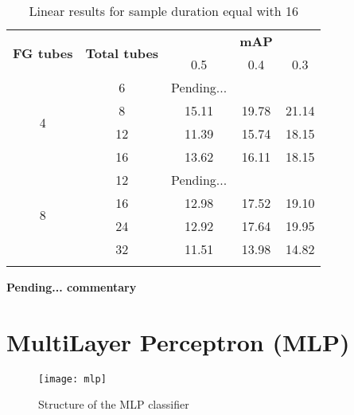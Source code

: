 \begin{center}
  \begin{longtable}{|| c | c || c c c ||}
    \hline
    \multirow{2}{*}{\textbf{FG tubes}} & \multirow{2}{*}{\textbf{Total tubes}} & {} & \textbf{mAP} & {} \\
    {} & {} & 0.5 & 0.4 & 0.3 \\
    \hline
    \multirow{4}{*}{4} & 6 & Pending...\\
    \cline{2-5}
    {} & 8 & 15.11 & 19.78 & 21.14 \\
    \cline{2-5}
    {} & 12 & 11.39 & 15.74 & 18.15 \\
    \cline{2-5}
    {} & 16 & 13.62 & 16.11 & 18.15 \\
    \hline
    \multirow{4}{*}{8} & 12 & Pending...\\
    \cline{2-5}
    {} & 16 & 12.98 & 17.52 & 19.10 \\
    \cline{2-5}
    {} & 24 & 12.92 & 17.64 & 19.95 \\
    \cline{2-5}
    {} & 32 & 11.51 & 13.98 & 14.82 \\
    \hline

  \caption{Linear results for sample duration equal with 16}
  \label{table:linear_16}
\end{longtable}
\end{center}

\textbf{ Pending... commentary}

\section{MultiLayer Perceptron (MLP)}

\begin{figure}[h]
  \centering
  \texttt{[image: mlp]}
  \caption{Structure of the MLP classifier}
  \label{fig:mlp_structure}
\end{figure}

